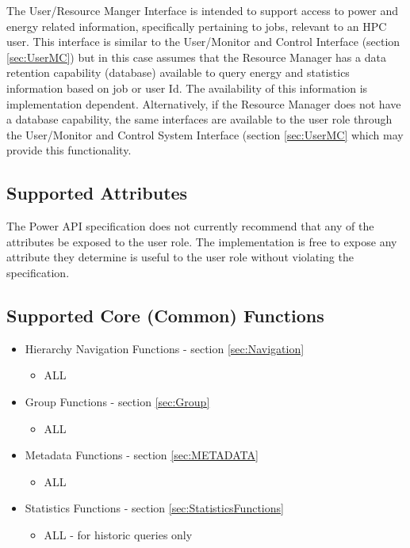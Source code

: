 The User/Resource Manger Interface is intended to support access to power and energy related information, specifically pertaining to jobs, relevant to an HPC user.
This interface is similar to the User/Monitor and Control Interface (section \ref{sec:UserMC}) but in this case assumes that the Resource Manager has a data retention capability (database) available to query energy and statistics information based on job or user Id.
The availability of this information is implementation dependent.
Alternatively, if the Resource Manager does not have a database capability, the same interfaces are available to the user role through the User/Monitor and Control System Interface (section \ref{sec:UserMC} which may provide this functionality.

\subsection{Supported Attributes}\label{sec:UserRMAttributes}
The Power API specification does not currently recommend that any of the attributes be exposed to the user role. 
The implementation is free to expose any attribute they determine is useful to the user role without violating the specification.

\subsection{Supported Core (Common) Functions}\label{sec:UserRMSupportedCommon}

\begin{itemize}[noitemsep,nolistsep] 
	\item{Hierarchy Navigation Functions - section \ref{sec:Navigation}}
		\begin{itemize}[noitemsep,nolistsep] 
			\item{ALL}
		\end{itemize}
	\item{Group Functions - section \ref{sec:Group}}
		\begin{itemize}[noitemsep,nolistsep] 
			\item{ALL}
		\end{itemize}
	\item{Metadata Functions - section \ref{sec:METADATA}}
		\begin{itemize}[noitemsep,nolistsep] 
			\item{ALL}
		\end{itemize}
	\item{Statistics Functions - section \ref{sec:StatisticsFunctions}}
		\begin{itemize}[noitemsep,nolistsep] 
			\item{ALL - for historic queries only}
		\end{itemize}
\end{itemize}

